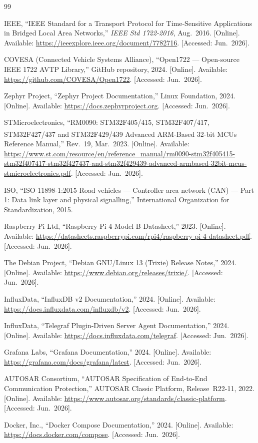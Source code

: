 \documentclass[11pt,a4paper]{article}
\begin{document}
\newpage
\begin{thebibliography}{99}

IEEE,
``IEEE Standard for a Transport Protocol for Time-Sensitive Applications in Bridged Local
Area Networks,''
\textit{IEEE Std 1722-2016}, Aug.\ 2016.
[Online]. Available: \url{https://ieeexplore.ieee.org/document/7782716}.
[Accessed: Jun.\ 2026].

COVESA (Connected Vehicle Systems Alliance),
``Open1722 --- Open-source IEEE 1722 AVTP Library,''
GitHub repository, 2024.
[Online]. Available: \url{https://github.com/COVESA/Open1722}.
[Accessed: Jun.\ 2026].

Zephyr Project,
``Zephyr Project Documentation,'' Linux Foundation, 2024.
[Online]. Available: \url{https://docs.zephyrproject.org}.
[Accessed: Jun.\ 2026].

STMicroelectronics,
``RM0090: STM32F405/415, STM32F407/417, STM32F427/437 and STM32F429/439 Advanced
ARM\textsuperscript{\textregistered}-Based 32-bit MCUs Reference Manual,''
Rev.~19, Mar.\ 2023.
[Online]. Available:
\url{https://www.st.com/resource/en/reference_manual/rm0090-stm32f405415-stm32f407417-stm32f427437-and-stm32f429439-advanced-armbased-32bit-mcus-stmicroelectronics.pdf}.
[Accessed: Jun.\ 2026].

ISO,
``ISO 11898-1:2015 Road vehicles --- Controller area network (CAN) --- Part 1: Data
link layer and physical signalling,''
International Organization for Standardization, 2015.

Raspberry Pi Ltd,
``Raspberry Pi 4 Model B Datasheet,''
2023.
[Online]. Available: \url{https://datasheets.raspberrypi.com/rpi4/raspberry-pi-4-datasheet.pdf}.
[Accessed: Jun.\ 2026].

The Debian Project,
``Debian GNU/Linux 13 (Trixie) Release Notes,''
2024.
[Online]. Available: \url{https://www.debian.org/releases/trixie/}.
[Accessed: Jun.\ 2026].

InfluxData,
``InfluxDB v2 Documentation,''
2024.
[Online]. Available: \url{https://docs.influxdata.com/influxdb/v2}.
[Accessed: Jun.\ 2026].

InfluxData,
``Telegraf Plugin-Driven Server Agent Documentation,''
2024.
[Online]. Available: \url{https://docs.influxdata.com/telegraf}.
[Accessed: Jun.\ 2026].

Grafana Labs,
``Grafana Documentation,''
2024.
[Online]. Available: \url{https://grafana.com/docs/grafana/latest}.
[Accessed: Jun.\ 2026].

AUTOSAR Consortium,
``AUTOSAR Specification of End-to-End Communication Protection,''
AUTOSAR Classic Platform, Release~R22-11, 2022.
[Online]. Available: \url{https://www.autosar.org/standards/classic-platform}.
[Accessed: Jun.\ 2026].

Docker, Inc.,
``Docker Compose Documentation,''
2024.
[Online]. Available: \url{https://docs.docker.com/compose}.
[Accessed: Jun.\ 2026].

\end{thebibliography}
\end{document}
